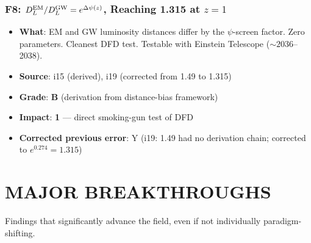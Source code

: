 \documentclass[11pt,a4paper]{article}
\newcommand{\grade}[1]{\textbf{#1}}
\newcommand{\impact}[1]{\textbf{#1}}
\begin{document}
\section{F8: $D_L^{\rm EM}/D_L^{\rm GW} = e^{\Delta\psi(z)}$, Reaching 1.315 at $z=1$}
\begin{itemize}[nosep]
\item \textbf{What}: EM and GW luminosity distances differ by the $\psi$-screen factor. Zero parameters. Cleanest DFD test. Testable with Einstein Telescope ($\sim 2036$--2038).
\item \textbf{Source}: i15 (derived), i19 (corrected from 1.49 to 1.315)
\item \textbf{Grade}: \grade{B} (derivation from distance-bias framework)
\item \textbf{Impact}: \impact{1} --- direct smoking-gun test of DFD
\item \textbf{Corrected previous error}: Y (i19: 1.49 had no derivation chain; corrected to $e^{0.274} = 1.315$)
\end{itemize}


\part{MAJOR BREAKTHROUGHS}
\label{part:major}

Findings that significantly advance the field, even if not individually paradigm-shifting.

\end{document}
